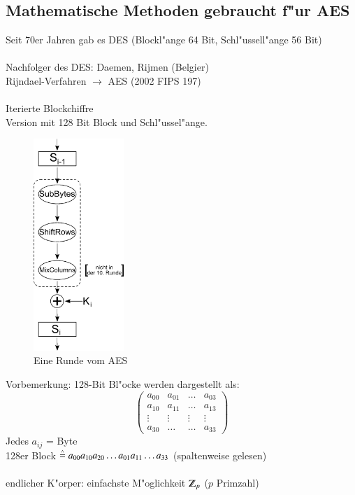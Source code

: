 \subsection{Mathematische Methoden gebraucht f"ur AES} %
Seit 70er Jahren gab es DES (Blockl"ange 64 Bit, Schl"ussell"ange 56 Bit) \\
\\
Nachfolger des DES: Daemen, Rijmen (Belgier)\\
Rijndael-Verfahren $\rightarrow$ AES (2002 FIPS 197)\\
\\
Iterierte Blockchiffre\\
Version mit 128 Bit Block und Schl"ussel"ange. \\
\begin{figure}[ht]
	\centering
	\includegraphics[height=8cm]{./img/AES_round.png}
	\caption{Eine Runde vom AES}
	\label{img:Eine Runde vom AES}
\end{figure}Vorbemerkung: 128-Bit Bl"ocke werden dargestellt als:\\
\[
	\begin{pmatrix}
		a_{00} & a_{01} & \ldots & a_{03} \\
		a_{10} & a_{11} & \ldots & a_{13}\\
		\vdots & \vdots  & \vdots & \vdots \\
		a_{30} & \ldots  & \ldots & a_{33}
	\end{pmatrix}
\]
Jedes $a_{ij}$ = Byte\\
128er Block $\stackrel{\scriptscriptstyle\wedge}{=} a_{00}a_{10}a_{20}\ldots a_{01}a_{11}\ldots a_{33}$ (spaltenweise gelesen)\\
\\
endlicher K"orper: einfachste M"oglichkeit $\Z_p$ ($p$ Primzahl)\\
